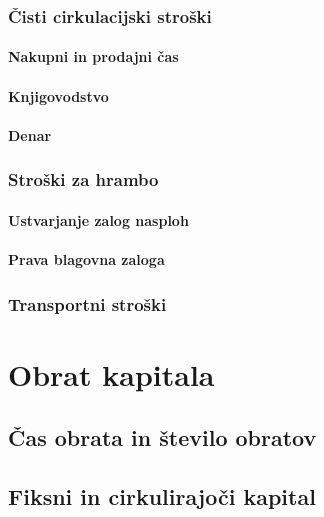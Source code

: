 \documentclass[a5paper]{scrbook}
\begin{document}
    \section{Čisti cirkulacijski stroški}

    \subsection{Nakupni in prodajni čas}

    \subsection{Knjigovodstvo}

    \subsection{Denar}

    \section{Stroški za hrambo}

    \subsection{Ustvarjanje zalog nasploh}

    \subsection{Prava blagovna zaloga}

    \section{Transportni stroški}

\part{Obrat kapitala}

\chapter{Čas obrata in število obratov}

\chapter{Fiksni in cirkulirajoči kapital}
\end{document}

